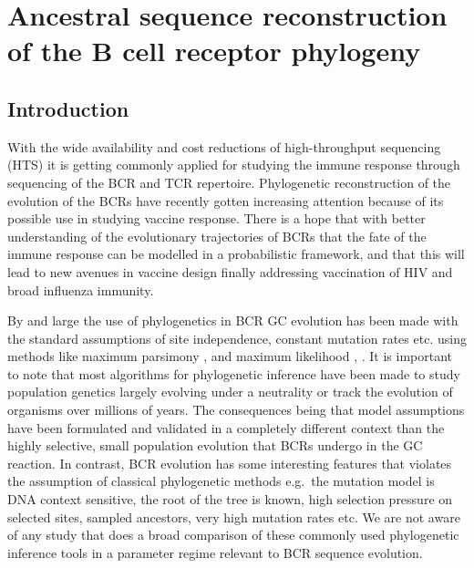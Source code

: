 \chapter{Ancestral sequence reconstruction of the B cell receptor phylogeny}

\section{Introduction}
With the wide availability and cost reductions of high-throughput sequencing (HTS) it is getting commonly applied for studying the immune response through sequencing of the BCR and TCR repertoire.
Phylogenetic reconstruction of the evolution of the BCRs have recently gotten increasing attention because of its possible use in studying vaccine response.
There is a hope that with better understanding of the evolutionary trajectories of BCRs that the fate of the immune response can be modelled in a probabilistic framework, and that this will lead to new avenues in vaccine design finally addressing vaccination of HIV and broad influenza immunity.

By and large the use of phylogenetics in BCR GC evolution has been made with the standard assumptions of site independence, constant mutation rates etc. using methods like maximum parsimony \cite{tas2016visualizing}, \cite{Barak2008-fw} and maximum likelihood \cite{Doria-Rose2014-vi}, \cite{Hoehn2016-wg}.
It is important to note that most algorithms for phylogenetic inference have been made to study population genetics largely evolving under a neutrality or track the evolution of organisms over millions of years.
The consequences being that model assumptions have been formulated and validated in a completely different context than the highly selective, small population evolution that BCRs undergo in the GC reaction.
In contrast, BCR evolution has some interesting features that violates the assumption of classical phylogenetic methods e.g.\ the mutation model is DNA context sensitive, the root of the tree is known, high selection pressure on selected sites, sampled ancestors, very high mutation rates etc.
We are not aware of any study that does a broad comparison of these commonly used phylogenetic inference tools in a parameter regime relevant to BCR sequence evolution.

